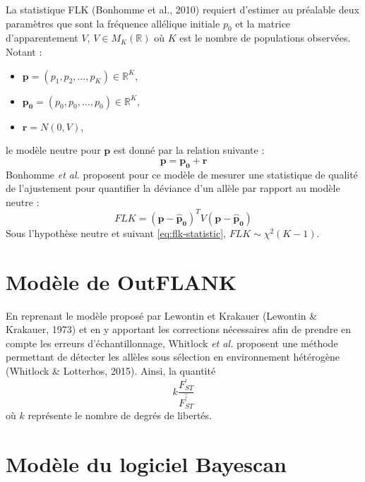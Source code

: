 \documentclass[12pt,twoside]{ugathesis}
\begin{document}
  La statistique FLK (Bonhomme et al., 2010) requiert d'estimer au
  préalable deux paramètres que sont la fréquence allélique initiale
  \(p_0\) et la matrice d'apparentement \(V\), \(V \in M_K(\mathbb{R})\)
  où \(K\) est le nombre de populations observées. Notant :
  \begin{itemize}
  \item
    \(\boldsymbol{p} = (p_1, p_2, \dots, p_K) \in \mathbb{R}^K\),
  \item
    \(\boldsymbol{p_0} = (p_0, p_0, \dots, p_0) \in \mathbb{R}^K\),
  \item
    \(\boldsymbol{r} = N(0, V)\),
  \end{itemize}
  le modèle neutre pour \(\boldsymbol{p}\) est donné par la relation
  suivante :
  \begin{equation} 
    \boldsymbol{p} = \boldsymbol{p_0} + \boldsymbol{r} 
    \label{eq:flk_neutral_model}
  \end{equation}
  Bonhomme \textit{et al.} proposent pour ce modèle de mesurer une
  statistique de qualité de l'ajustement pour quantifier la déviance d'un
  allèle par rapport au modèle neutre :
  \begin{equation} 
    FLK = (\boldsymbol{p - \hat{p}_0})^T V (\boldsymbol{p - \hat{p}_0})                                \label{eq:flk-statistic}
  \end{equation}
  Sous l'hypothèse neutre et suivant \eqref{eq:flk-statistic},
  \(FLK \sim \chi^2 (K - 1)\).
  
  \section{Modèle de OutFLANK}\label{modele-de-outflank}
  
  En reprenant le modèle proposé par Lewontin et Krakauer (Lewontin \&
  Krakauer, 1973) et en y apportant les corrections nécessaires afin de
  prendre en compte les erreurs d'échantillonnage, Whitlock
  \textit{et al.} proposent une méthode permettant de détecter les allèles
  sous sélection en environnement hétérogène (Whitlock \& Lotterhos,
  2015). Ainsi, la quantité
  \begin{equation} 
    k \frac{F_{ST}^{\prime}}{\bar{{F_{ST}^{\prime}}}}  
    \label{eq:OutFLANK-statistic}
  \end{equation}
  où \(k\) représente le nombre de degrés de libertés.
  
  \section{Modèle du logiciel Bayescan}\label{modele-du-logiciel-bayescan}
  
\end{document}
